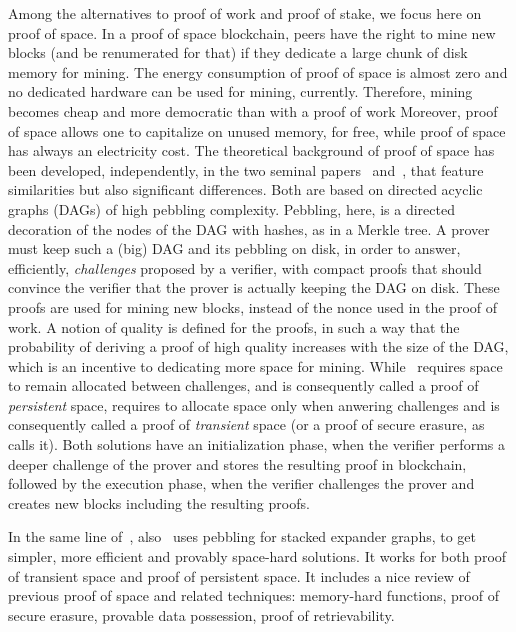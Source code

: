 Among the alternatives to proof of work and proof of stake, we focus here on proof of space.
In a proof of space blockchain, peers have the right to mine new blocks (and be renumerated for that) if they dedicate
a large chunk of disk memory for mining. The energy consumption of proof of space is almost zero
and no dedicated hardware can be used for mining, currently. Therefore, mining becomes cheap and
more democratic than with a proof of work
Moreover, proof of space allows one to capitalize on unused memory, for free,
while proof of space has always an electricity cost.
The theoretical background of proof of space has been developed, independently,
in the two seminal papers~\cite{AtenieseBFG14} and~\cite{DziembowskiFKP15},
that feature similarities but also significant differences. Both are based
on directed acyclic graphs (DAGs) of high pebbling complexity.
Pebbling, here, is a directed decoration of the nodes of the DAG with hashes, as in
a Merkle tree.
A prover must keep such a (big) DAG and its pebbling on disk, in order to answer, efficiently,
\emph{challenges} proposed by a verifier, with compact proofs that should convince the verifier that
the prover is actually keeping the DAG on disk. These proofs are used for mining new blocks,
instead of the nonce used in the proof of work. A notion of quality is defined for
the proofs, in such a way that the probability of deriving a proof of high quality increases
with the size of the DAG, which is an incentive to dedicating more space for mining.
While~\cite{DziembowskiFKP15} requires space to remain allocated between challenges,
and is consequently called a proof of \emph{persistent} space, \cite{AtenieseBFG14} requires
to allocate space only when anwering challenges and is consequently called
a proof of \emph{transient} space (or a proof of secure erasure, as~\cite{DziembowskiFKP15} calls it).
Both solutions have an initialization phase, when the verifier performs a deeper challenge
of the prover and stores the resulting proof in blockchain, followed by the execution phase,
when the verifier challenges the prover and creates new blocks including the resulting proofs.

In the same line of~\cite{AtenieseBFG14,DziembowskiFKP15}, also~\cite{RenD16} uses
pebbling for stacked expander graphs, to get simpler, more efficient and
provably space-hard solutions.
It works for both proof of transient space and proof of persistent space.
It includes a nice review of previous proof of space
and related techniques: memory-hard functions, proof of secure erasure, provable data possession,
proof of retrievability.

